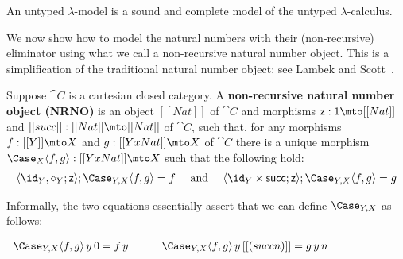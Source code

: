 \begin{theorem}
  \label{thm:untyped-lambda-model-sound-complete}
  An untyped $\lambda$-model is a sound and complete model of the untyped $\lambda$-calculus.
\end{theorem}

We now show how to model the natural numbers with their
(non-recursive) eliminator using what we call a non-recursive natural
number object.  This is a simplification of the traditional natural
number object; see Lambek and Scott~\cite{Lambek:1988}.
\begin{definition}
  \label{def:SNNO}
  Suppose $\cat{C}$ is a cartesian closed category.  A
  \textbf{non-recursive natural number object (NRNO)} is an object
  $[[Nat]]$ of $\cat{C}$ and morphisms $\mathsf{z} : 1 \mto [[Nat]]$
  and $[[succ]] : [[Nat]] \mto [[Nat]]$ of $\cat{C}$, such that, for
  any morphisms $f : [[Y]] \mto X$ and $g : [[Y x Nat]] \mto X$ of
  $\cat{C}$ there is a unique morphism $\Case_{X} \langle f,g \rangle : [[Y x Nat]] \mto X$
  such that the following hold:
  \[
  \begin{array}{lll}
    \langle \id_Y, \diamond_Y;\mathsf{z} \rangle;\Case_{Y,X} \langle f,g \rangle = f & \text{ and } & 
    \langle \id_Y \times \mathsf{succ};\mathsf{z} \rangle;\Case_{Y,X} \langle f,g \rangle = g\\
  \end{array}
  \]

  \noindent
       Informally, the two equations essentially assert that we can
       define $\Case_{Y,X}$ as follows:
       \begin{center}
         \begin{math}
           \begin{array}{ccccccccccc}
             {\Case_{Y,X} \langle f,g \rangle\,y\,0 = f\,y}
             & \quad & 
             {\Case_{Y,X} \langle f,g \rangle\,y\,[[(succ n)]] =  g\,y\,n}
           \end{array}
         \end{math}
       \end{center}
\end{definition}

